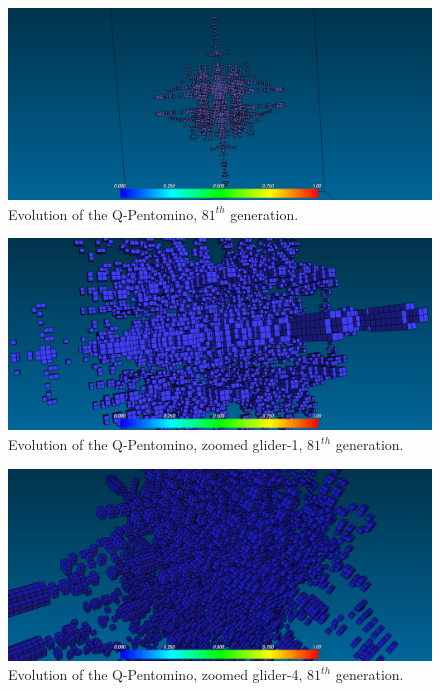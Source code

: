 \begin{figure}
	\centering
	\includegraphics[scale=0.3]{pentominoes_ss/r_81.png}
	\caption{Evolution of the Q-Pentomino, $81^{th}$ generation.}
  \label{fig:ss-pent:r-81}
\end{figure}

\begin{figure}
	\centering
	\includegraphics[scale=0.3]{pentominoes_ss/r_81_glider1.png}
	\caption{Evolution of the Q-Pentomino, zoomed glider-1, $81^{th}$ generation.}
  \label{fig:ss-pent:r-81-glider1}
\end{figure}

\begin{figure}
	\centering
	\includegraphics[scale=0.3]{pentominoes_ss/r_81_glider4.png}
	\caption{Evolution of the Q-Pentomino, zoomed glider-4, $81^{th}$ generation.}
  \label{fig:ss-pent:r-81-glider4}
\end{figure}

